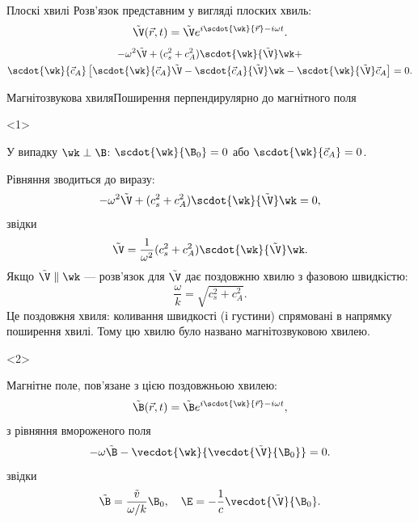\documentclass[]{beamer}
\begin{document}
\begin{frame}{Плоскі хвилі}{}
	Розв'язок представним у вигляді плоских хвиль:
	\begin{equation*}
		\tilde{\V}(\vec{r}, t) = \tilde{\V}e^{i\scdot{\wk}{\vec{r}} - i\omega t}.
	\end{equation*}
	\begin{multline*}
		-\omega^2\tilde{\V} + (c_s^2 + c_A^2)\scdot{\wk}{\tilde{\V}}\wk + \\
		\scdot{\wk}{\vec{c}_A}\left[\scdot{\wk}{\vec{c}_A}\tilde{\V} - \scdot{\vec{c}_A}{\tilde{\V}}\wk - \scdot{\wk}{\tilde{\V}}\vec{c}_A  \right] = 0.
	\end{multline*}
\end{frame}

\begin{frame}{Магнітозвукова хвиля}{Поширення перпендирулярно до магнітного поля}
	\begin{onlyenv}
		\begin{block}{}\justifying
			У випадку $\wk\perp \B$: \(\scdot{\wk}{\B_0} = 0\) або \(\scdot{\wk}{\vec{c}_A} = 0 \).

			Рівняння зводиться до виразу:
			\begin{equation*}
				-\omega^2\tilde{\V} + (c_s^2 + c_A^2)\scdot{\wk}{\tilde{\V}}\wk = 0,
			\end{equation*}
			звідки
			\begin{equation*}
				\tilde{\V} = \frac1{\omega^2}(c_s^2 + c_A^2)\scdot{\wk}{\tilde{\V}}\wk.
			\end{equation*}
			Якщо $\tilde{\V}\parallel\wk$ ---  розв'язок для $\tilde{\V}$ дає поздовжню хвилю з фазовою швидкістю:
			\begin{equation*}
				\frac\omega{k} = \sqrt{c_s^2 + c_A^2}.
			\end{equation*}
			Це поздовжня хвиля: коливання швидкості (і густини) спрямовані в напрямку поширення хвилі. Тому цю хвилю було названо \alert{магнітозвуковою хвилею}.
		\end{block}
	\end{onlyenv}
	\begin{onlyenv}
		\begin{block}{}\justifying
			Магнітне поле, пов'язане з цією поздовжньою хвилею:
			\begin{equation*}
				\tilde{\B}(\vec{r}, t) = \tilde{\B}e^{i\scdot{\wk}{\vec{r}} - i\omega t},
			\end{equation*}
			з рівняння вмороженого поля
			\begin{equation*}
				-\omega\tilde{\B} - \vecdot{\wk}{\vecdot{\tilde{\V}}{\B_0}} = 0.
			\end{equation*}
			звідки
			\begin{equation*}
				\tilde{\B} = \frac{\tilde{v}}{\omega / k} \B_0, \quad \E = -\frac1c\vecdot{\tilde{\V}}{\B_0}.
			\end{equation*}


\end{block}
\end{onlyenv}
\end{frame}
\end{document}

